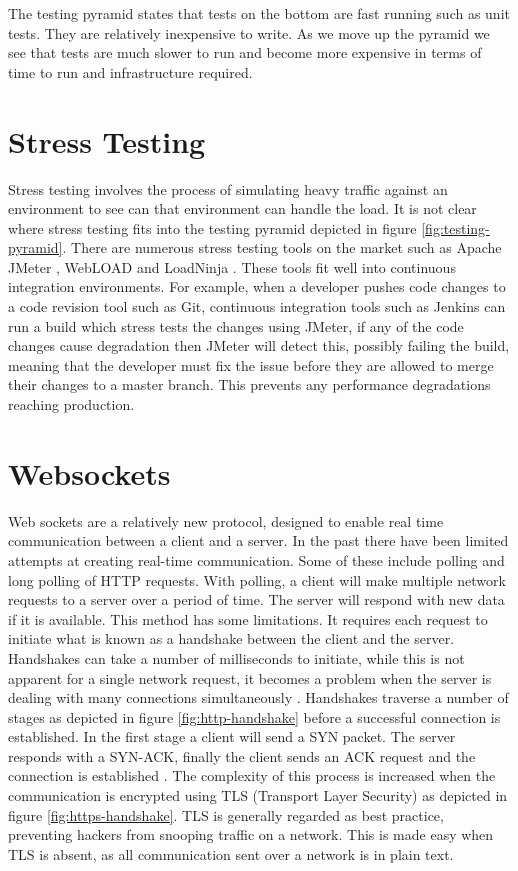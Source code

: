 The testing pyramid states that tests on the bottom are fast running such as unit tests. They are relatively inexpensive to write. As we move up the pyramid we see that tests are much slower to run and become more expensive in terms of time to run and infrastructure required.

\section{Stress Testing}

Stress testing involves the process of simulating heavy traffic against an environment to see can that environment can handle the load. It is not clear where stress testing fits into the testing pyramid depicted in figure \ref{fig:testing-pyramid}. There are numerous stress testing tools on the market such as Apache JMeter \cite{jmeter}, WebLOAD \cite{webload} and LoadNinja \cite{loadninja}. These tools fit well into continuous integration environments. For example, when a developer pushes code changes to a code revision tool such as Git, continuous integration tools such as Jenkins can run a build which stress tests the changes using JMeter, if any of the code changes cause degradation then JMeter will detect this, possibly failing the build, meaning that the developer must fix the issue before they are allowed to merge their changes to a master branch. This prevents any performance degradations reaching production.

\section{Websockets}

Web sockets are a relatively new protocol, designed to enable real time communication between a client and a server. In the past there have been limited attempts at creating real-time communication. Some of these include polling and long polling of HTTP requests. With polling, a client will make multiple network requests to a server over a period of time. The server will respond with new data if it is available. This method has some limitations. It requires each request to initiate what is known as a handshake between the client and the server. Handshakes can take a number of milliseconds to initiate, while this is not apparent for a single network request, it becomes a problem when the server is dealing with many connections simultaneously \cite{5735801}. Handshakes traverse a number of stages as depicted in figure \ref{fig:http-handshake} before a successful connection is established. In the first stage a client will send a SYN packet. The server responds with a SYN-ACK, finally the client sends an ACK request and the connection is established \cite{5735801}. The complexity of this process is increased when the communication is encrypted using TLS (Transport Layer Security) as depicted in figure \ref{fig:https-handshake}. TLS is generally regarded as best practice, preventing hackers from snooping traffic on a network. This is made easy when TLS is absent, as all communication sent over a network is in plain text.

